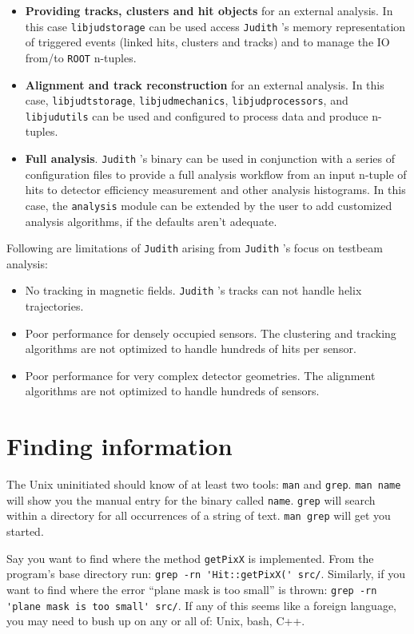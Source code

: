 \documentclass[10pt,a4paper]{book}
\newcommand{\ROOT}{\Verb`ROOT` }
\newcommand{\Judith}{\Verb`Judith` }
\begin{document}
\begin{itemize}
	\item \textbf{Providing tracks, clusters and hit objects} for an external analysis. In this case \Verb`libjudstorage` can be used access \Judith's memory representation of triggered events (linked hits, clusters and tracks) and to manage the IO from/to \ROOT n-tuples.
	\item \textbf{Alignment and track reconstruction} for an external analysis. In this case, \Verb`libjudtstorage`, \Verb`libjudmechanics`, \Verb`libjudprocessors`, and \Verb`libjudutils` can be used and configured to process data and produce n-tuples.
	\item \textbf{Full analysis}. \Judith's binary can be used in conjunction with a series of configuration files to provide a full analysis workflow from an input n-tuple of hits to detector efficiency measurement and other analysis histograms. In this case, the \Verb`analysis` module can be extended by the user to add customized analysis algorithms, if the defaults aren't adequate.
\end{itemize}

Following are limitations of \Judith arising from \Judith's focus on testbeam analysis:

\begin{itemize}
	\item No tracking in magnetic fields. \Judith's tracks can not handle helix trajectories.
	\item Poor performance for densely occupied sensors. The clustering and tracking algorithms are not optimized to handle hundreds of hits per sensor.
	\item Poor performance for very complex detector geometries. The alignment algorithms are not optimized to handle hundreds of sensors.
\end{itemize}

\section{Finding information}

The Unix uninitiated should know of at least two tools: \Verb`man` and \Verb`grep`. \Verb`man name` will show you the manual entry for the binary called \Verb`name`. \Verb`grep` will search within a directory for all occurrences of a string of text. \Verb`man grep` will get you started.

Say you want to find where the method \Verb`getPixX` is implemented. From the program's base directory run: \Verb`grep -rn 'Hit::getPixX(' src/`. Similarly, if you want to find where the error ``plane mask is too small'' is thrown: \Verb`grep -rn 'plane mask is too small' src/`. If any of this seems like a foreign language, you may need to bush up on any or all of: Unix, bash, C++.
\end{document}
